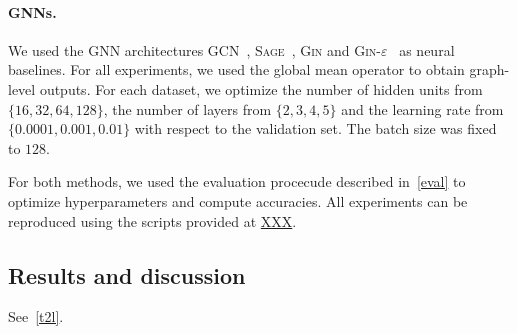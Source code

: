 \documentclass{article}
\theoremstyle{definition}
\begin{document}
\paragraph{GNNs.} We used the GNN architectures \textsc{GCN}~\cite{Kip+2017}, \textsc{Sage}~\cite{Ham+2017}, \textsc{Gin} and \textsc{Gin-$\varepsilon$}~\cite{Xu+2018b} as neural baselines. For all experiments, we used the global mean operator to obtain graph-level outputs. For each dataset, we optimize the number of hidden units from $
\{16, 32, 64, 128\}$, the number of layers from $ \{2, 3, 4, 5\}$ and the learning rate from $ \{0.0001, 0.001, 0.01 \}$ with respect to the validation set. The batch size was fixed to $128$.

For both methods, we used the evaluation procecude described in~\cref{eval} to optimize hyperparameters and compute accuracies. All experiments can be reproduced using the scripts provided at \url{XXX}.

\subsection{Results and discussion}
See~\cref{t2l}.
\end{document}

